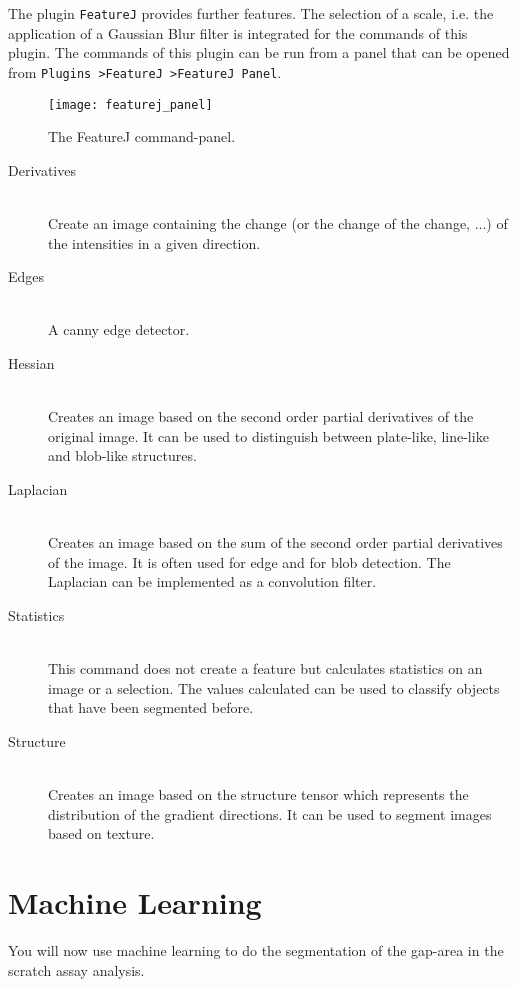 The plugin {\tt FeatureJ} provides further features. The selection of a scale, i.e. the application of a Gaussian Blur filter is integrated for the commands of this plugin. The commands of this plugin can be run from a panel that can be opened from {\tt Plugins \textgreater FeatureJ \textgreater FeatureJ Panel}.

\begin{figure}[!htb]
 \centering
 \texttt{[image: featurej\_panel]}
 \caption{The FeatureJ command-panel.}
 \label{figure:featurej}
\end{figure}

\begin{description}
 \item[Derivatives] \hfill \\ 
 Create an image containing the change (or the change of the change, ...) of the intensities in a given direction.
 \item[Edges] \hfill \\
 A canny edge detector.
 \item[Hessian] \hfill \\
 Creates an image based on the second order partial derivatives of the original image. It can be used to distinguish between plate-like, line-like and blob-like structures.
 \item[Laplacian] \hfill \\
 Creates an image based on the sum of the second order partial derivatives of the image. It is often used for edge and for blob detection. The Laplacian can be implemented as a convolution filter.
 \item[Statistics] \hfill \\
 This command does not create a feature but calculates statistics on an image or a selection. The values calculated can be used to classify objects that have been segmented before.
  \item[Structure] \hfill \\
Creates an image based on the structure tensor which represents the distribution of the gradient directions. It can be used to segment images based on texture.
\end{description}

\section{Machine Learning}

You will now use machine learning to do the segmentation of the gap-area in the scratch assay analysis. 

